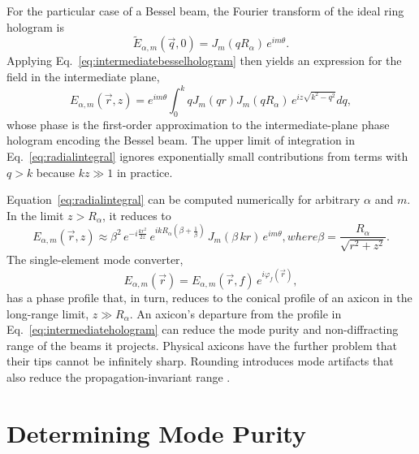 For the particular case of a Bessel beam,
the Fourier transform of the ideal ring hologram is
\begin{equation}
  \tilde{E}_{\alpha,m}(\vec{q},0)
  =
  J_m(qR_\alpha) \, e^{i m \theta}.
\end{equation}
Applying Eq.~\eqref{eq:intermediatebesselhologram}
then yields an expression for the field in the 
intermediate plane,
\begin{equation}
  \label{eq:radialintegral}
  E_{\alpha,m}(\vec{r},z)
  =
  e^{i m \theta}
  \int_0^k 
  q 
  J_m(q r) 
  J_m(qR_\alpha) \, 
  e^{i z \sqrt{k^2 - q^2}} dq ,
\end{equation}
whose phase is the first-order approximation to the
intermediate-plane phase hologram encoding the Bessel beam.
The upper limit of integration in Eq.~\eqref{eq:radialintegral}
ignores exponentially small contributions from terms with
$q > k$ because $kz \gg 1$ in practice.

Equation~\eqref{eq:radialintegral} can be computed
numerically for arbitrary $\alpha$ and $m$.  
In the limit $z > R_\alpha$, it reduces to
\begin{subequations}
  \label{eq:intermediatehologram}
\begin{equation}
  E_{\alpha,m}(\vec{r}, z)
  \approx
  \beta^2 \,
  e^{-i \frac{k r^2}{2 z}} \, 
  e^{i k R_\alpha \left(\beta + \frac{1}{\beta}\right)} \,
  J_m\left( \beta \, kr \right) \, e^{i m \theta} ,
\end{equation}
where
\begin{equation}
  \beta
  =
    \frac{R_\alpha}{\sqrt{r^2 + z^2}}.
  \end{equation}
\end{subequations}
The single-element mode converter,
\begin{equation}
  \label{eq:besselfield}
  E_{\alpha,m}(\vec{r}) 
  =
  E_{\alpha,m}(\vec{r},f) \, e^{i \varphi_f(\vec{r})},
\end{equation}
has a phase profile that, in turn, reduces to the
conical profile of an axicon in the long-range
limit, $z \gg R_\alpha$.
An axicon's departure from the profile
in Eq.~\eqref{eq:intermediatehologram}
can reduce the mode purity and non-diffracting
range of the beams it projects.
Physical axicons have the further problem that
their tips cannot be infinitely sharp.
Rounding introduces mode artifacts that also reduce the 
propagation-invariant range \cite{brzobohaty08}.


\section{Determining Mode Purity}

